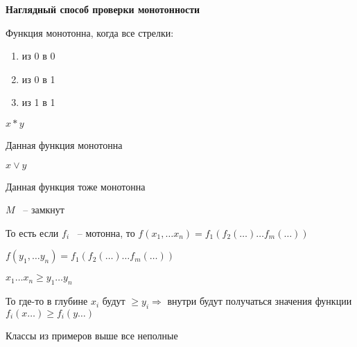 \documentclass[russian]{lecture-notes}
\begin{document}
	\textbf{Наглядный способ проверки монотонности}
	
	Функция монотонна, когда все стрелки:
	\begin{enumerate}
		\item из 0 в 0
		\item из 0 в 1
		\item из 1 в 1
	\end{enumerate}		

\begin{example}
	$x * y$
	
	Данная функция монотонна 
	
\end{example}

\begin{example}
	$x \lor y$
	
	Данная функция тоже монотонна 
	
\end{example}

\begin{proposition}
	$M$ ~-- замкнут
	
	То есть если $f_i$ ~-- мотонна, то $f(x_1, \dots x_n) = f_1(f_2(\dots) \dots f_m(\dots))$
	
	$f(y_1, \dots y_n) = f_1(f_2(\dots) \dots f_m(\dots))$
	
	$x_1 \dots x_n \geq y_1 \dots y_n$
	
	То где-то в глубине $x_i$ будут $\geq y_i \Rightarrow$ внутри будут получаться значения функции $f_i(x \dots) \geq f_i(y \dots)$
\end{proposition}

\begin{remark}
	Классы из примеров выше все неполные
\end{remark}
\end{document}
